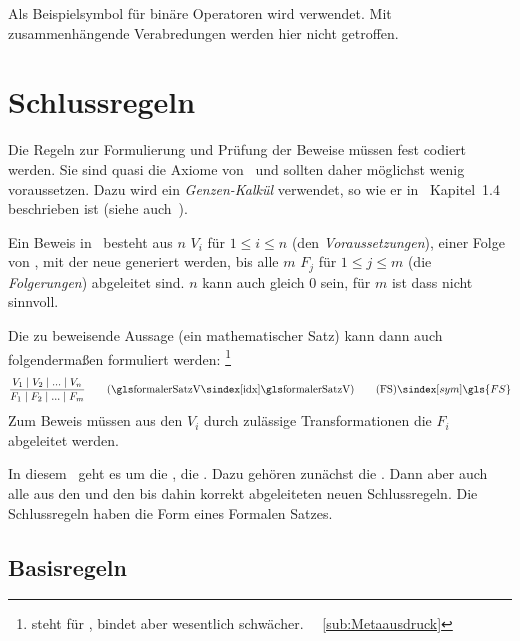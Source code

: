 Als Beispielsymbol für binäre Operatoren wird \symqt{$\opbsp$} verwendet.
Mit \symqt{$\opbsp$} zusammenhängende Verabredungen werden hier nicht getroffen.

\section{Schlussregeln}%
\label{sec:Schlussregeln}

Die Regeln zur Formulierung und Prüfung der Beweise müssen fest codiert werden.
Sie sind quasi die Axiome von \ASBA\ und sollten daher möglichst wenig voraussetzen.
Dazu wird ein \emph{Genzen-Kalkül} verwendet, so wie er in~\cite{bib:Rautenberg} Kapitel~1.4 beschrieben ist (siehe auch~\cite{bib:NatuerlichesSchliessen,bib:Schlussregel}).

Ein Beweis in \ASBA\ besteht aus $n$  $V_i$ für $1 \leq i \leq n$ (den \emph{Voraussetzungen}), einer Folge von , mit der neue  generiert werden, bis alle $m$  $F_j$ für $1 \leq j \leq m$ (die \emph{Folgerungen}) abgeleitet sind. $n$ kann auch gleich $0$ sein, für $m$ ist dass nicht sinnvoll.

Die zu beweisende Aussage (\textzB ein mathematischer Satz) kann dann auch folgendermaßen formuliert werden:%
\footnote{%
	\symqt{$\und$} steht für  \textbzw {}, bindet aber wesentlich schwächer.
	\seealso\ \subsectionname~\vref{sub:Metaausdruck}
}
\[
	\frac{V_1 \und V_2 \und ... \und V_n}{F_1 \und F_2 \und ... \und F_m}
	\qquad \text{(\glsIdx{formalerSatzV})}
	\tag{\tagFS} \sym{\gls{FS}} \label{def:formalerSatz}
\]
Zum Beweis müssen aus den $V_i$ durch zulässige Transformationen die $F_i$ abgeleitet werden.

In diesem \sectionname\ geht es um die , \textdh die . Dazu gehören zunächst die .
Dann aber auch alle aus den  und den bis dahin  korrekt abgeleiteten neuen Schlussregeln.
Die Schlussregeln haben die Form eines Formalen Satzes.

\subsection{Basisregeln}%
\label{sub:Basisregeln}

